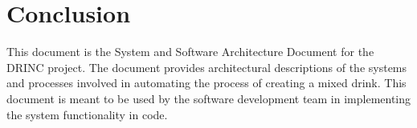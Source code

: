 \chapter{Conclusion}

    This document is the System and Software Architecture Document for 
    the DRINC project. The document provides architectural descriptions 
    of the systems and processes involved in automating the process of 
    creating a mixed drink.  This document is meant to be used by the 
    software development team in implementing the system functionality in code.
